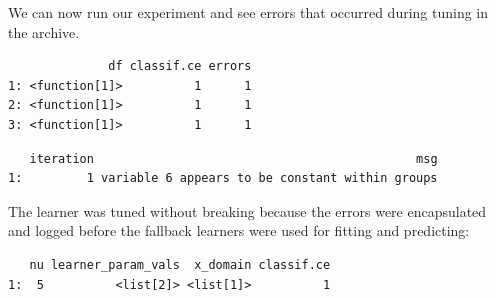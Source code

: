 We can now run our experiment and see errors that occurred during tuning
in the archive.

\begin{Shaded}
\begin{Highlighting}[]
\OtherTok{=} 
  \NormalTok{)}

\SpecialCharTok{$}\NormalTok{archive)[}\SpecialCharTok{:}\NormalTok{, .(df, classif.ce, errors)]}
\end{Highlighting}
\end{Shaded}

\begin{verbatim}
              df classif.ce errors
1: <function[1]>          1      1
2: <function[1]>          1      1
3: <function[1]>          1      1
\end{verbatim}

\begin{Shaded}
\begin{Highlighting}[]
\SpecialCharTok{$}\SpecialCharTok{$}\NormalTok{(}\NormalTok{)}\SpecialCharTok{$}
\end{Highlighting}
\end{Shaded}

\begin{verbatim}
   iteration                                             msg
1:         1 variable 6 appears to be constant within groups
\end{verbatim}

The learner was tuned without breaking because the errors were
encapsulated and logged before the fallback learners were used for
fitting and predicting:

\begin{Shaded}
\begin{Highlighting}[]
\SpecialCharTok{$}
\end{Highlighting}
\end{Shaded}

\begin{verbatim}
   nu learner_param_vals  x_domain classif.ce
1:  5          <list[2]> <list[1]>          1
\end{verbatim}

